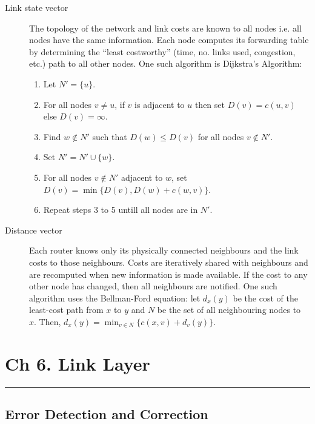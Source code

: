 \documentclass{article}
\begin{document}
\begin{description}
    \item[Link state vector] The topology of the network and link costs are known to all nodes i.e.
    all nodes have the same information. Each node computes its forwarding table by determining the
    ``least costworthy'' (time, no. links used, congestion, etc.) path to all other nodes. One such 
    algorithm is Dijkstra's Algorithm:
    \begin{enumerate}
        \item Let $N'=\{u\}$.
        \item For all nodes $v\neq u$, if $v$ is adjacent to $u$ then set $D(v)=c(u,v)$ else $D(v)=\infty$.
        \item Find $w\notin N'$ such that $D(w)\leq D(v)$ for all nodes $v\notin N'.$
        \item Set $N'=N'\cup\{w\}$.
        \item For all nodes $v\notin N'$ adjacent to $w$, set $D(v)=\min\{D(v), D(w)+c(w,v)\}$.
        \item Repeat steps 3 to 5 untill all nodes are in $N'$.
    \end{enumerate}
    
    \item[Distance vector] Each router knows only its physically connected neighbours and the link
    costs to those neighbours. Costs are iteratively shared with neighbours and are recomputed when
    new information is made available. If the cost to any other node has changed, then all neighbours 
    are notified. One such algorithm uses the Bellman-Ford equation: let $d_x(y)$ be the cost of the
    least-cost path from $x$ to $y$ and $N$ be the set of all neighbouring nodes to $x.$ Then, 
    $d_x(y)=\min_{v\in N}\{c(x,v)+d_v(y)\}$.
\end{description}

\section*{Ch 6. Link Layer}
\noindent
\rule{\linewidth}{0.5mm}
\noindent

\subsection*{Error Detection and Correction}
\end{document}
